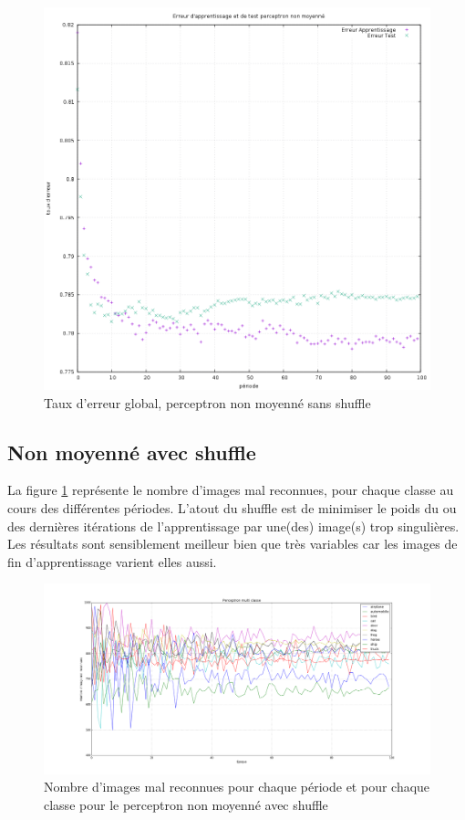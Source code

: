 \begin{figure}[H]
\includegraphics[width=\textwidth]{images/erreur_Perceptron_multiclasse_non_moyenne.png}
\caption{Taux d'erreur global, perceptron non moyenné sans shuffle}
\end{figure}


\subsection{Non moyenné avec shuffle}

La figure \ref{fig:perceptron-non-moyenne-shuffle} représente le nombre d'images mal reconnues, pour chaque classe au cours des différentes périodes.
L'atout du shuffle est de minimiser le poids du ou des dernières itérations de l'apprentissage par une(des) image(s) trop singulières. Les résultats sont sensiblement meilleur bien que très variables car les images de fin d'apprentissage varient elles aussi.

\begin{figure}[H]
\begin{center}
\includegraphics[width=\textwidth]{images/Perceptron_multiclasse_non_moyenne_shuffle.png}
\caption{Nombre d'images mal reconnues pour chaque période et pour chaque classe pour le perceptron non moyenné avec shuffle}
\label{fig:perceptron-non-moyenne-shuffle}
\end{center}
\end{figure}

